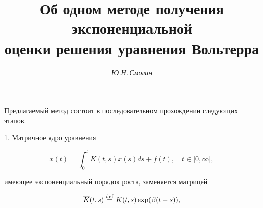 






\author{\it Ю.Н.\,Смолин}




\title{Об одном методе получения экспоненциальной \\


оценки решения уравнения Вольтерра}





\date{}




\pagestyle{plain} %










\maketitle


\label{begin}










Предлагаемый метод состоит в последовательном прохождении следующих этапов.





1. Матричное ядро уравнения


\begin{equation}


x(t)=\int_0^t K(t,s)x(s)ds+f(t),\quad t\in[0,\infty[,


\end{equation}


имеющее экспоненциальный порядок роста, заменяется матрицей


\begin{equation}


\overline K(t,s)\df K(t,s)\exp(\beta(t-s)),


\end{equation}


